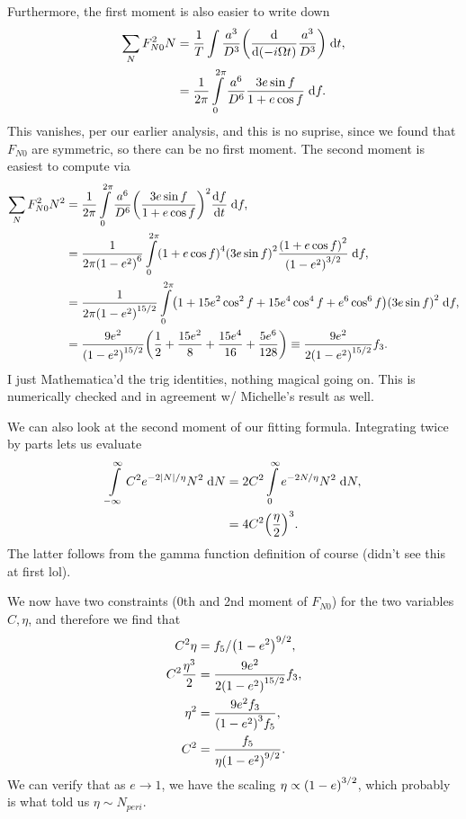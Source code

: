 \documentclass[11pt,
        usenames, %
        dvipsnames %
    ]{article}
\newcommand*{\rd}[2]{\frac{\mathrm{d}#1}{\mathrm{d}#2}}
\DeclarePairedDelimiter\abs{\lvert}{\rvert}
\DeclarePairedDelimiter\p{\lparen}{\rparen}
\begin{document}
Furthermore, the first moment is also easier to write down
\begin{align}
    \sum\limits_N F_{N0}^2N
        &= \frac{1}{T} \int\limits \frac{a^3}{D^3}
            \p*{\rd{}{\p*{-i \Omega t}} \frac{a^3}{D^3}}\;\mathrm{d}t,\\
        &= \frac{1}{2\pi}\int\limits_0^{2\pi}
            \frac{a^6}{D^6} \frac{3e\sin f}{1 + e \cos f} \;\mathrm{d}f.
\end{align}
This vanishes, per our earlier analysis, and this is no suprise, since we found
that $F_{N0}$ are symmetric, so there can be no first moment. The second moment
is easiest to compute via
\begin{align}
    \sum\limits_N F_{N0}^2N^2
        &= \frac{1}{2\pi}\int\limits_0^{2\pi}
            \frac{a^6}{D^6} \p*{\frac{3e\sin f}{1 + e \cos f}}^2
                \rd{f}{t}\;\mathrm{d}f
                ,\\
        &= \frac{1}{2\pi\p*{1 - e^2}^6}\int\limits_0^{2\pi}
            \p*{1 + e\cos f}^4\p*{3e\sin f}^2
                \frac{\p*{1 + e \cos f}^2}{\p*{1 - e^2}^{3/2}}\;\mathrm{d}f,\\
        &= \frac{1}{2\pi\p*{1 - e^2}^{15/2}}\int\limits_0^{2\pi}
            \p*{1 + 15e^2\cos^2f + 15e^4\cos^4f
                + e^6\cos^6 f}\p*{3e\sin f}^2\;\mathrm{d}f,\\
        &= \frac{9e^2}{\p*{1 - e^2}^{15/2}}\p*{
            \frac{1}{2} + \frac{15e^2}{8} + \frac{15e^4}{16}
                + \frac{5e^6}{128}}
            \equiv \frac{9e^2}{2\p*{1 - e^2}^{15/2}}f_3.
\end{align}
I just Mathematica'd the trig identities, nothing magical going on. This is
numerically checked and in agreement w/ Michelle's result as well.

We can also look at the second moment of our fitting formula. Integrating twice
by parts lets us evaluate
\begin{align}
    \int\limits_{-\infty}^\infty C^2e^{-2\abs*{N} / \eta} N^2\;\mathrm{d}N
        &= 2C^2\int\limits_0^\infty e^{-2N/\eta}N^2\;\mathrm{d}N,\\
        &= 4C^2\p*{\frac{\eta}{2}}^3.
\end{align}
The latter follows from the gamma function definition of course (didn't see this
at first lol).

We now have two constraints (0th and 2nd moment of $F_{N0}$) for the two
variables $C, \eta$, and therefore we find that
\begin{align}
    C^2\eta &= f_5 / \p*{1 - e^2}^{9/2},\\
    C^2 \frac{\eta^3}{2} &= \frac{9e^2}{2\p*{1 - e^2}^{15/2}}f_3,\\
    \eta^2 &= \frac{9e^2f_3}{\p*{1 - e^2}^{3}f_5},\\
    C^2 &= \frac{f_5}{\eta\p*{1 - e^2}^{9/2}}.
\end{align}
We can verify that as $e \to 1$, we have the scaling $\eta \propto \p*{1 -
e}^{3/2}$, which probably is what told us $\eta \sim N_{peri}$.
\end{document}
